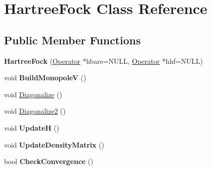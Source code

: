 \hypertarget{classHartreeFock}{\section{Hartree\-Fock Class Reference}
\label{classHartreeFock}
}
\subsection*{Public Member Functions}
\begin{DoxyCompactItemize}
\item 
\hypertarget{classHartreeFock_a266bbab13102a2044077943fa969ee25}{{\bfseries Hartree\-Fock} (\hyperlink{classOperator}{Operator} $\ast$hbare=N\-U\-L\-L, \hyperlink{classOperator}{Operator} $\ast$hhf=N\-U\-L\-L)}\label{classHartreeFock_a266bbab13102a2044077943fa969ee25}

\item 
\hypertarget{classHartreeFock_a3d6bac9b4403e4bc599a89ad0c9b6056}{void {\bfseries Build\-Monopole\-V} ()}\label{classHartreeFock_a3d6bac9b4403e4bc599a89ad0c9b6056}

\item 
void \hyperlink{classHartreeFock_a00f7b0c4cb7373a3f1a69ca27a4dfaed}{Diagonalize} ()
\begin{DoxyCompactList}\small\item\em 

 \end{DoxyCompactList}\item 
void \hyperlink{classHartreeFock_a0e10a3dc1f022f1fdee2720e9e1a9c19}{Diagonalize2} ()
\begin{DoxyCompactList}\small\item\em 

 \end{DoxyCompactList}\item 
\hypertarget{classHartreeFock_a75b0261aedd649c7114f48613919fbed}{void {\bfseries Update\-H} ()}\label{classHartreeFock_a75b0261aedd649c7114f48613919fbed}

\item 
\hypertarget{classHartreeFock_aad38c905e7e9f9e9757b5800e6910c61}{void {\bfseries Update\-Density\-Matrix} ()}\label{classHartreeFock_aad38c905e7e9f9e9757b5800e6910c61}

\item 
\hypertarget{classHartreeFock_a35ab9c4f96e68b1c9acea1d1407ecc60}{bool {\bfseries Check\-Convergence} ()}\label{classHartreeFock_a35ab9c4f96e68b1c9acea1d1407ecc60}


\end{DoxyCompactItemize}
